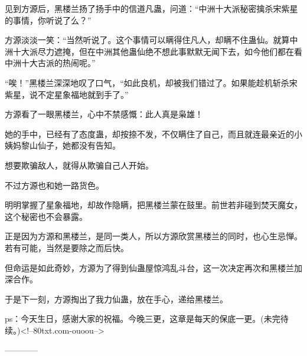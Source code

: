 \begin{this_body}
见到方源后，黑楼兰扬了扬手中的信道凡蛊，问道：“中洲十大派秘密擒杀宋紫星的事情，你听说了么？”

方源淡淡一笑：“当然听说了。这个事情可以瞒得住凡人，却瞒不住蛊仙。就算中洲十大派尽力遮掩，但在中洲其他蛊仙绝不想此事默默无闻下去，如今他们都在看中洲十大古派的热闹呢。”

“唉！”黑楼兰深深地叹了口气，“如此良机，却被我们错过了。如果能趁机斩杀宋紫星，说不定星象福地就到手了。”

方源看了一眼黑楼兰，心中不禁感慨：此人真是枭雄！

她的手中，已经有了态度蛊，却按捺不发，不仅瞒住了自己，而且就连最亲近的小姨妈黎山仙子，她都没有告知。

想要欺骗敌人，就得从欺骗自己人开始。

不过方源也和她一路货色。

明明掌握了星象福地，却故作隐瞒，把黑楼兰蒙在鼓里。前世若非碰到焚天魔女，这个秘密也不会暴露。

正是因为方源和黑楼兰，是同一类人，所以方源欣赏黑楼兰的同时，也心生忌惮。若有可能，当然是要除之而后快。

但命运是如此奇妙，方源为了得到仙蛊屋惊鸿乱斗台，这一次决定再次和黑楼兰加深合作。

于是下一刻，方源掏出了我力仙蛊，放在手心，递给黑楼兰。

ps：今天生日，感谢大家的祝福。今晚三更，这章是每天的保底一更。(未完待续。)<!--80txt.com-ouoou-->

------------

\end{this_body}

